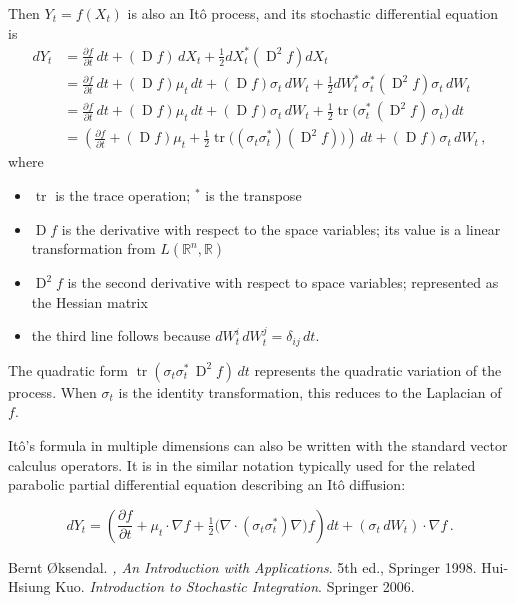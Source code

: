 \documentclass[12pt]{article}
\newcommand{\real}{\mathbb{R}}
\providecommand{\pd}[2]{\frac{\partial #1}{\partial #2}}
\DeclareMathOperator{\D}{D}
\DeclareMathOperator{\tr}{tr}
\begin{document}
Then $Y_t = f(X_t)$ is also an It\^o process, and its stochastic
differential equation
is
\begin{align*}
d Y_t 
      &= \pd{f}{t} \, dt + (\D f ) \, dX_t 
                + \tfrac12 dX_t^* ( \D^2 f ) dX_t \\
      &= \pd{f}{t} \, dt + (\D f ) \mu_t \, dt 
                + (\D f) \sigma_t \, dW_t 
                + \tfrac12 dW_t^* \, \sigma_t^* ( \D^2 f ) \sigma_t \, dW_t \\
      &= \pd{f}{t} \, dt + (\D f) \mu_t \, dt 
                + (\D f) \sigma_t \, dW_t 
                + \tfrac12 \tr\bigl( \sigma_t^* \,
                                  (\D^2 f) \, \sigma_t \bigr) \, dt \\
      &= \left( \pd{f}{t} + (\D f) \mu_t
                + \tfrac12 \tr\bigl( (\sigma_t \sigma_t^* ) (\D^2 f) \bigr) 
         \right) \, dt 
                + (\D f) \sigma_t \, dW_t \,,
\end{align*}
where 
\begin{itemize}
\item
$\tr$ is the trace operation; ${}^\ast$ is the transpose
\item
$\D f$ is the derivative with respect to the space variables;
its value is a linear transformation from $L(\real^n, \real)$
\item
$\D^2 f$ is the second derivative with respect to space variables;
represented as the Hessian matrix
\item
the third line follows because $dW_t^i \, dW_t^j = \delta_{ij} \, dt$.
\end{itemize}

The quadratic form $\tr(\sigma_t \sigma_t^* \, \D^2 f) \, dt $
represents the quadratic variation of the process.  When $\sigma_t$ is the identity
transformation, this reduces to the Laplacian of $f$.

It\^o's formula in multiple dimensions can also be written with
the standard vector calculus operators.
It is in the similar notation typically used for the 
related parabolic partial differential equation
describing an It\^o diffusion:

\[
d Y_t 
      = \left( \pd{f}{t} + \mu_t \cdot \nabla f
                + \tfrac12 \bigl( \nabla \cdot (\sigma_t \sigma_t^*) \nabla \bigr) f
         \right)  dt 
                + ( \sigma_t \, dW_t ) \cdot \nabla f \,.
\]


\begin{thebibliography}{9}
Bernt \O{}ksendal.
{\em {},
An Introduction with Applications}. 5th ed., Springer 1998.
Hui-Hsiung Kuo. {\em Introduction to Stochastic Integration}.
Springer 2006.
\end{thebibliography}

\end{document}
